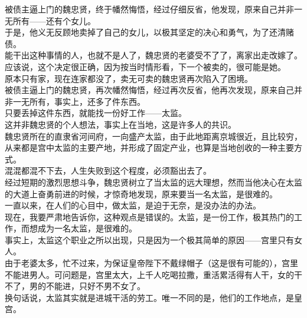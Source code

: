 \begin{multicols}{\theparacolNo}
被债主逼上门的魏忠贤，终于幡然悔悟，经过仔细反省，他发现，原来自己并非一无所有——还有个女儿。\\

于是，他义无反顾地卖掉了自己的女儿，以极其坚定的决心和勇气，为了还清赌债。\\

能干出这种事情的人，也就不是人了，魏忠贤的老婆受不了了，离家出走改嫁了。应该说，这个决定很正确，因为按当时情形看，下一个被卖的，很可能是她。\\

原本只有家，现在连家都没了，卖无可卖的魏忠贤再次陷入了困境。\\

被债主逼上门的魏忠贤，再次幡然悔悟，经过再次反省，他再次发现，原来自己并非一无所有，事实上，还多了件东西。\\

只要丢掉这件东西，就能找一份好工作——太监。\\

这并非魏忠贤的个人想法，事实上在当地，这是许多人的共识。\\

魏忠贤所在的直隶省河间府，一向盛产太监，由于此地距离京城很近，且比较穷，从来都是宫中太监的主要产地，并形成了固定产业，也算是当地创收的一种主要方式。\\

混混都混不下去，人生失败到这个程度，必须豁出去了。\\

经过短期的激烈思想斗争，魏忠贤树立了当太监的远大理想，然而当他决心在太监的大道上奋勇前进的时候，才惊奇地发现，原来要当一名太监，是很难的。\\

一直以来，在人们的心目中，做太监，是迫于无奈，是没办法的办法。\\

现在，我要严肃地告诉你，这种观点是错误的。太监，是一份工作，极其热门的工作，而想成为一名太监，是很难的。\\

事实上，太监这个职业之所以出现，只是因为一个极其简单的原因——宫里只有女人。\\

由于老婆太多，忙不过来，为保证皇帝陛下不戴绿帽子（这是很有可能的），宫里不能进男人。可问题是，宫里太大，上千人吃喝拉撒，重活累活得有人干，女的干不了，男的不能进，只好不男不女了。\\

换句话说，太监其实就是进城干活的劳工。唯一不同的是，他们的工作地点，是皇宫。\\


\end{multicols}

